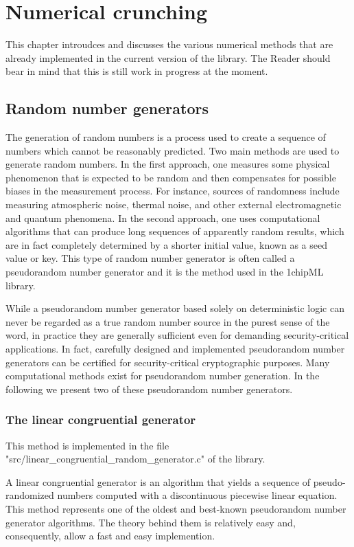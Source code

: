 \documentclass{book}
\begin{document}
\chapter{Numerical crunching}

This chapter introudces and discusses the various numerical methods that are already implemented in the current version of the library.
The Reader should bear in mind that this is still work in progress at the moment.

\section{Random number generators}

The generation of random numbers is a process used to create a sequence of numbers which cannot be reasonably predicted.
Two main methods are used to generate random numbers. In the first approach, one measures some physical phenomenon that
is expected to be random and then compensates for possible biases in the measurement process. For instance, sources of
randomness include measuring atmospheric noise, thermal noise, and other external electromagnetic and quantum phenomena.
In the second approach, one uses computational algorithms that can produce long sequences of apparently random results,
which are in fact completely determined by a shorter initial value, known as a seed value or key. This type of random
number generator is often called a pseudorandom number generator and it is the method used in the 1chipML library.

While a pseudorandom number generator based solely on deterministic logic can never be regarded as a true random number
source in the purest sense of the word, in practice they are generally sufficient even for demanding security-critical
applications. In fact, carefully designed and implemented pseudorandom number generators can be certified for security-critical
cryptographic purposes. Many computational methods exist for pseudorandom number generation. In the following we present two of these pseudorandom number generators.

\subsection{The linear congruential generator}

This method is implemented in the file "src/linear\_congruential\_random\_generator.c" of the library.

A linear congruential generator is an algorithm that yields a sequence of pseudo-randomized numbers computed
with a discontinuous piecewise linear equation. This method represents one of the oldest and best-known pseudorandom
number generator algorithms. The theory behind them is relatively easy and, consequently, allow a fast and easy implemention.
\end{document}
